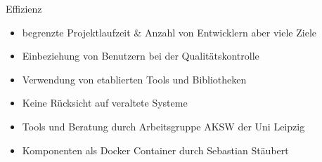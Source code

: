 \documentclass{beamer}
\begin{document}
\begin{frame}{Effizienz}
\begin{itemize}
\item begrenzte Projektlaufzeit \& Anzahl von Entwicklern aber viele Ziele
\item Einbeziehung von Benutzern bei der Qualitätskontrolle 
\item Verwendung von etablierten Tools und Bibliotheken 
\item Keine Rücksicht auf veraltete Systeme
\item Tools und Beratung durch Arbeitsgruppe AKSW der Uni Leipzig
\item Komponenten als Docker Container durch Sebastian Stäubert 
\end{itemize}
\end{frame}

\end{document}
